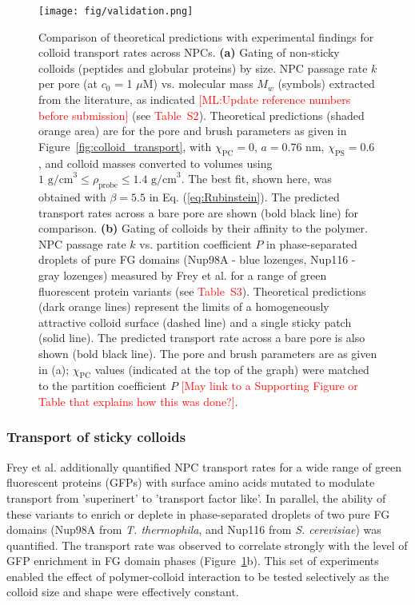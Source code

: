 \documentclass[12pt, a4paper]{article}
\newcommand\todo[1]{\textcolor{red}{#1}}
\begin{document}
\begin{figure}
    \centering
    \centerline{\texttt{[image: fig/validation.png]}}
    \caption{
    Comparison of theoretical predictions with experimental findings for colloid transport rates across NPCs.
    \textbf{(a)} 
    Gating of non-sticky colloids (peptides and globular proteins) by size.
    NPC passage rate $k$ per pore (at $c_0$ = 1 $\mu\text{M}$) vs. molecular mass $M_w$ (symbols) extracted from the literature, as indicated \todo{[ML:Update reference numbers before submission]} (see \todo{Table~S2}).
    Theoretical predictions (shaded orange area) are for the pore and brush parameters as given in Figure~\ref{fig:colloid_transport}, with $\chi_{\text{PC}} = 0$, $a = 0.76$ nm, $\chi_{\text{PS}} = 0.6$, and colloid masses converted to volumes using $\text{1 g/cm}^3 \leq \rho_{\text{probe}} \leq \text{1.4 g/cm}^3$.
    The best fit, shown here, was obtained with $\beta = 5.5$ in Eq. (\ref{eq:Rubinstein}).
    The predicted transport rates across a bare pore are shown (bold black line) for comparison.
    \textbf{(b)} 
    Gating of colloids by their affinity to the polymer.
    NPC passage rate $k$ vs. partition coefficient $P$ in phase-separated droplets of pure FG domains (Nup98A - blue lozenges, Nup116 - gray lozenges) measured by Frey et al. \cite{Frey2018} for a range of green fluorescent protein variants (see \todo{Table~S3}).
    Theoretical predictions (dark orange lines) represent the limits of a homogeneously attractive colloid surface (dashed line) and a single sticky patch (solid line).
    The predicted transport rate across a bare pore is also shown (bold black line).
    The pore and brush parameters are as given in (a); $\chi_\text{PC}$ values (indicated at the top of the graph) were matched to the partition coefficient $P$ \todo{[May link to a Supporting Figure or Table that explains how this was done?]}.
    }
    \label{fig:NPC_comparison}
\end{figure}


\subsubsection{Transport of sticky colloids}
\label{sec:transport_of_sticky_colloids}

Frey et al. \cite{Frey2018} additionally quantified NPC transport rates for a wide range of green fluorescent proteins (GFPs) with surface amino acids mutated to modulate transport from 'superinert' to 'transport factor like'.
In parallel, the ability of these variants to enrich or deplete in phase-separated droplets of two pure FG domains (Nup98A from \textit{T. thermophila}, and Nup116 from \textit{S. cerevisiae}) was quantified.
The transport rate was observed to correlate strongly with the level of GFP enrichment in FG domain phases (Figure~\ref{fig:NPC_comparison}b).
This set of experiments enabled the effect of polymer-colloid interaction to be tested selectively as the colloid size and shape were effectively constant.
\end{document}
